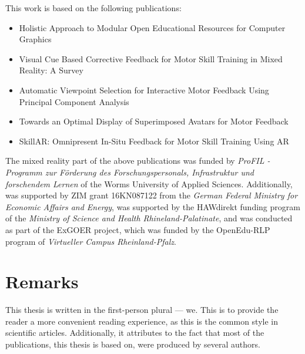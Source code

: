 This work is based on the following publications:
\begin{itemize}
	\setlength{\itemsep}{-0.3cm}
	\item Holistic Approach to Modular Open Educational Resources for Computer Graphics \cite{diller2024holistic}
	\item Visual Cue Based Corrective Feedback for Motor Skill Training in Mixed Reality: A Survey \cite{diller2022vcb}
	\item Automatic Viewpoint Selection for Interactive Motor Feedback Using Principal Component Analysis \cite{diller2024automatic}
	\item Towards an Optimal Display of Superimposed Avatars for Motor Feedback \cite{diller2025towards}
	\item SkillAR: Omnipresent In-Situ Feedback for Motor Skill Training Using AR \cite{diller2024skillar}
\end{itemize}


The mixed reality part of the above publications was funded by \emph{ProFIL - Programm zur Förderung des Forschungspersonals, Infrastruktur und forschendem Lernen} of the Worms University of Applied Sciences. Additionally, \cite{diller2024automatic} was supported by ZIM grant 16KN087122 from the \emph{German Federal Ministry for Economic Affairs and Energy}, \cite{diller2024skillar} was supported by the HAWdirekt funding program of the \emph{Ministry of Science and Health Rhineland-Palatinate}, and \cite{diller2024holistic} was conducted as part of the ExGOER project, which was funded by the OpenEdu-RLP program of \emph{Virtueller Campus Rheinland-Pfalz}.

\section{Remarks}

This thesis is written in the first-person plural --- we. This is to provide the reader a more convenient reading experience, as this is the common style in scientific articles. Additionally, it attributes to the fact that most of the publications, this thesis is based on, were produced by several authors.